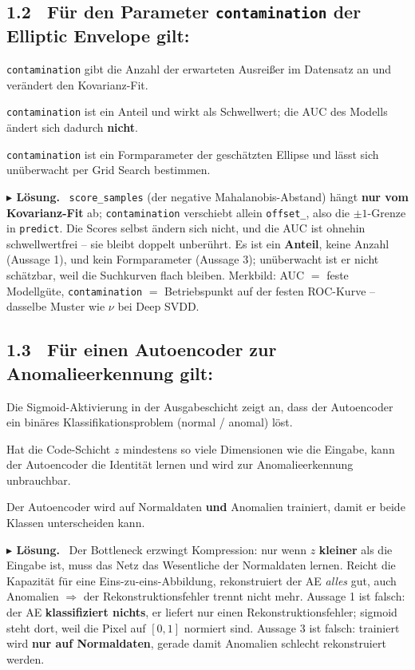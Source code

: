 \documentclass[10pt,a4paper]{article}
\newcommand{\mcbox}{\raisebox{-1pt}{\fbox{\rule{0pt}{7pt}\rule{7pt}{0pt}}}\hspace{6pt}}
\newcommand{\mcja}{\raisebox{-1pt}{{\fboxrule0.9pt\fcolorbox{loesfarbe}{white}{%
  \rule{0pt}{7pt}\makebox[7pt][c]{\color{loesfarbe}\scriptsize\bfseries X}}}}\hspace{6pt}}
\newenvironment{loes}%
  {\par\vspace{2pt}\begingroup\small\noindent\textbf{\color{loesfarbe}$\blacktriangleright$ Lösung.}\ }%
  {\endgroup\par\vspace{5pt}}
\begin{document}
\subsection*{1.2 \ Für den Parameter \texttt{contamination} der Elliptic Envelope gilt:}
\mcbox \texttt{contamination} gibt die Anzahl der erwarteten Ausreißer im Datensatz an und
verändert den Kovarianz-Fit.

\mcja \texttt{contamination} ist ein Anteil und wirkt als Schwellwert; die AUC des Modells
ändert sich dadurch \textbf{nicht}.

\mcbox \texttt{contamination} ist ein Formparameter der geschätzten Ellipse und lässt sich
unüberwacht per Grid Search bestimmen.

\begin{loes}
\texttt{score\_samples} (der negative Mahalanobis-Abstand) hängt \textbf{nur vom Kovarianz-Fit} ab;
\texttt{contamination} verschiebt allein \texttt{offset\_}, also die $\pm1$-Grenze in
\texttt{predict}. Die Scores selbst ändern sich nicht, und die AUC ist ohnehin schwellwertfrei --
sie bleibt doppelt unberührt. Es ist ein \textbf{Anteil}, keine Anzahl (Aussage 1), und kein
Formparameter (Aussage 3); unüberwacht ist er nicht schätzbar, weil die Suchkurven flach bleiben.
Merkbild: AUC $=$ feste Modellgüte, \texttt{contamination} $=$ Betriebspunkt auf der festen
ROC-Kurve -- dasselbe Muster wie $\nu$ bei Deep SVDD.
\end{loes}

\subsection*{1.3 \ Für einen Autoencoder zur Anomalieerkennung gilt:}
\mcbox Die Sigmoid-Aktivierung in der Ausgabeschicht zeigt an, dass der Autoencoder ein binäres
Klassifikationsproblem (normal / anomal) löst.

\mcja Hat die Code-Schicht $z$ mindestens so viele Dimensionen wie die Eingabe, kann der
Autoencoder die Identität lernen und wird zur Anomalieerkennung unbrauchbar.

\mcbox Der Autoencoder wird auf Normaldaten \textbf{und} Anomalien trainiert, damit er beide
Klassen unterscheiden kann.

\begin{loes}
Der Bottleneck erzwingt Kompression: nur wenn $z$ \textbf{kleiner} als die Eingabe ist, muss das
Netz das Wesentliche der Normaldaten lernen. Reicht die Kapazität für eine Eins-zu-eins-Abbildung,
rekonstruiert der AE \emph{alles} gut, auch Anomalien $\Rightarrow$ der Rekonstruktionsfehler
trennt nicht mehr.
Aussage 1 ist falsch: der AE \textbf{klassifiziert nichts}, er liefert nur einen
Rekonstruktionsfehler; sigmoid steht dort, weil die Pixel auf $[0,1]$ normiert sind.
Aussage 3 ist falsch: trainiert wird \textbf{nur auf Normaldaten}, gerade damit Anomalien schlecht
rekonstruiert werden.
\end{loes}
\end{document}
